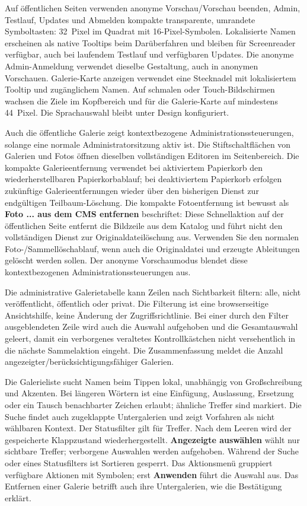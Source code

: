 \documentclass[11pt,a4paper]{article}
\newcommand{\ui}[1]{\textbf{#1}}
\begin{document}
Auf öffentlichen Seiten verwenden anonyme Vorschau/Vorschau beenden, Admin,
Testlauf, Updates und Abmelden kompakte transparente, umrandete Symboltasten:
32~Pixel im Quadrat mit 16-Pixel-Symbolen. Lokalisierte Namen erscheinen als
native Tooltips beim Darüberfahren und bleiben für Screenreader verfügbar,
auch bei laufendem Testlauf und verfügbaren Updates. Die anonyme Admin-Anmeldung
verwendet dieselbe Gestaltung, auch in anonymen Vorschauen. Galerie-Karte
anzeigen verwendet eine Stecknadel mit lokalisiertem Tooltip und zugänglichem
Namen. Auf schmalen oder Touch-Bildschirmen wachsen die Ziele im Kopfbereich
und für die Galerie-Karte auf mindestens 44~Pixel. Die Sprachauswahl bleibt
unter Design konfiguriert.

Auch die öffentliche Galerie zeigt kontextbezogene Administrationssteuerungen,
solange eine normale Administratorsitzung aktiv ist. Die Stiftschaltflächen von
Galerien und Fotos öffnen dieselben vollständigen Editoren im Seitenbereich. Die
kompakte Galerieentfernung verwendet bei aktiviertem Papierkorb den
wiederherstellbaren Papierkorbablauf; bei deaktiviertem Papierkorb erfolgen
zukünftige Galerieentfernungen wieder über den bisherigen Dienst zur endgültigen
Teilbaum-Löschung. Die kompakte Fotoentfernung ist bewusst als \ui{Foto ... aus
dem CMS entfernen} beschriftet: Diese Schnellaktion auf der öffentlichen Seite
entfernt die Bildzeile aus dem Katalog und führt nicht den vollständigen Dienst
zur Originaldateilöschung aus. Verwenden Sie den normalen
Foto-/Sammellöschablauf, wenn auch die Originaldatei und erzeugte Ableitungen
gelöscht werden sollen. Der anonyme Vorschaumodus blendet diese kontextbezogenen
Administrationssteuerungen aus.

Die administrative Galerietabelle kann Zeilen nach Sichtbarkeit filtern: alle,
nicht veröffentlicht, öffentlich oder privat. Die Filterung ist eine
browserseitige Ansichtshilfe, keine Änderung der Zugriffsrichtlinie. Bei einer
durch den Filter ausgeblendeten Zeile wird auch die Auswahl aufgehoben und die
Gesamtauswahl geleert, damit ein verborgenes veraltetes Kontrollkästchen nicht
versehentlich in die nächste Sammelaktion eingeht. Die Zusammenfassung meldet
die Anzahl angezeigter/berücksichtigungsfähiger Galerien.

Die Galerieliste sucht Namen beim Tippen lokal, unabhängig von Großschreibung
und Akzenten. Bei längeren Wörtern ist eine Einfügung, Auslassung, Ersetzung oder
ein Tausch benachbarter Zeichen erlaubt; ähnliche Treffer sind markiert. Die
Suche findet auch zugeklappte Untergalerien und zeigt Vorfahren als nicht
wählbaren Kontext. Der Statusfilter gilt für Treffer. Nach dem Leeren wird der
gespeicherte Klappzustand wiederhergestellt. \ui{Angezeigte auswählen} wählt nur
sichtbare Treffer; verborgene Auswahlen werden aufgehoben. Während der Suche oder
eines Statusfilters ist Sortieren gesperrt. Das Aktionsmenü gruppiert verfügbare
Aktionen mit Symbolen; erst \ui{Anwenden} führt die Auswahl aus. Das Entfernen
einer Galerie betrifft auch ihre Untergalerien, wie die Bestätigung erklärt.
\end{document}
